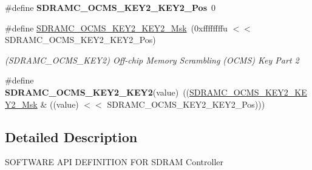 \begin{DoxyCompactItemize}
\item 
\mbox{\label{group__SAMS70__SDRAMC_ga7a2a31e2cacb71d4e7ef8788168221b0}} 
\#define {\bfseries S\+D\+R\+A\+M\+C\+\_\+\+O\+C\+M\+S\+\_\+\+K\+E\+Y2\+\_\+\+K\+E\+Y2\+\_\+\+Pos}~0
\item 
\mbox{\label{group__SAMS70__SDRAMC_gadf72e098f3b0fbc622694203aae6fa80}} 
\#define \mbox{\hyperlink{group__SAMS70__SDRAMC_gadf72e098f3b0fbc622694203aae6fa80}{S\+D\+R\+A\+M\+C\+\_\+\+O\+C\+M\+S\+\_\+\+K\+E\+Y2\+\_\+\+K\+E\+Y2\+\_\+\+Msk}}~(0xffffffffu $<$$<$ S\+D\+R\+A\+M\+C\+\_\+\+O\+C\+M\+S\+\_\+\+K\+E\+Y2\+\_\+\+K\+E\+Y2\+\_\+\+Pos)
\begin{DoxyCompactList}\small\item\em (S\+D\+R\+A\+M\+C\+\_\+\+O\+C\+M\+S\+\_\+\+K\+E\+Y2) Off-\/chip Memory Scrambling (O\+C\+MS) Key Part 2 \end{DoxyCompactList}\item 
\mbox{\label{group__SAMS70__SDRAMC_gaca7b60dd7970cf6a278623e5d9f74205}} 
\#define {\bfseries S\+D\+R\+A\+M\+C\+\_\+\+O\+C\+M\+S\+\_\+\+K\+E\+Y2\+\_\+\+K\+E\+Y2}(value)~((\mbox{\hyperlink{group__SAMV71__SDRAMC_gadf72e098f3b0fbc622694203aae6fa80}{S\+D\+R\+A\+M\+C\+\_\+\+O\+C\+M\+S\+\_\+\+K\+E\+Y2\+\_\+\+K\+E\+Y2\+\_\+\+Msk}} \& ((value) $<$$<$ S\+D\+R\+A\+M\+C\+\_\+\+O\+C\+M\+S\+\_\+\+K\+E\+Y2\+\_\+\+K\+E\+Y2\+\_\+\+Pos)))
\end{DoxyCompactItemize}


\subsection{Detailed Description}
S\+O\+F\+T\+W\+A\+RE A\+PI D\+E\+F\+I\+N\+I\+T\+I\+ON F\+OR S\+D\+R\+AM Controller 